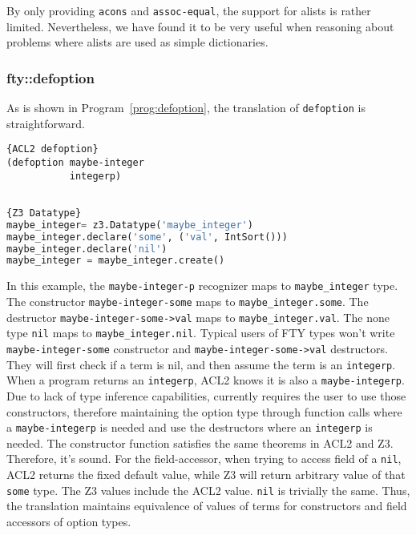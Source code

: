 By only providing \texttt{acons} and \texttt{assoc-equal}, the \smtlink{}
support for alists is rather limited.  Nevertheless, we have found it to be very
useful when reasoning about problems where alists are used as simple
dictionaries. 

\subsubsection{fty::defoption}
As is shown in Program~\ref{prog:defoption}, the translation of
\texttt{defoption} is straightforward.

\noindent\begin{minipage}{.35\textwidth}\label{prog:defoption}
\begin{lstlisting}[caption=ACL2 deflist,frame=tlrb,style=snippet,language=LISP]{ACL2 defoption}
(defoption maybe-integer
           integerp)


\end{lstlisting}
\end{minipage}\hfill
\begin{minipage}{.61\textwidth}
\begin{lstlisting}[caption=Z3 Datatype,frame=tlrb,style=snippet,language=Python]{Z3 Datatype}
maybe_integer= z3.Datatype('maybe_integer')
maybe_integer.declare('some', ('val', IntSort()))
maybe_integer.declare('nil')
maybe_integer = maybe_integer.create()
\end{lstlisting}
\end{minipage}

In this example, the \texttt{maybe-integer-p} recognizer maps to
\texttt{maybe_integer} type. The constructor \texttt{maybe-integer-some} maps to
\texttt{maybe_integer.some}. The destructor \texttt{maybe-integer-some->val} 
maps to \texttt{maybe_integer.val}. The none type \texttt{nil} maps to
\texttt{maybe_integer.nil}. Typical users of FTY types won't write
\texttt{maybe-integer-some} constructor and \texttt{maybe-integer-some->val}
destructors. They will first check if a term is nil, and then assume the term is
an \texttt{integerp}. When a program returns an \texttt{integerp}, ACL2 knows it
is also a \texttt{maybe-integerp}. Due to lack of type inference capabilities,
\smtlink{} currently requires the user to use those constructors, therefore
maintaining the option type through function calls where a
\texttt{maybe-integerp} is needed and use the destructors where an
\texttt{integerp} is needed.  The constructor function satisfies the same theorems
in ACL2 and Z3.  Therefore, it's sound.  For the field-accessor, when trying to
access field of a \texttt{nil}, ACL2 returns the fixed default value, while Z3
will return arbitrary value of that \texttt{some} type. The Z3 values include
the ACL2 value.  \texttt{nil} is trivially the same. Thus, the \smtlink{}
translation maintains equivalence of values of terms for constructors and field
accessors of option types.


